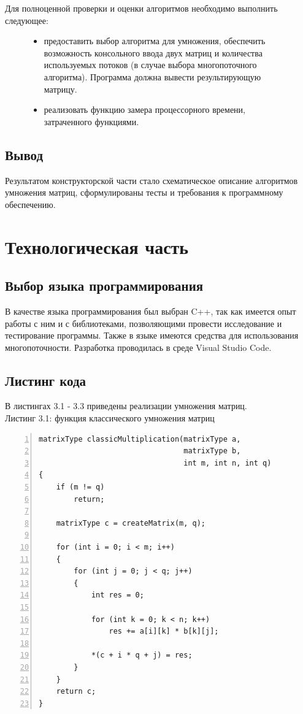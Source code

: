 \documentclass[12pt,a4paper]{report}
\begin{document}
Для полноценной проверки и оценки алгоритмов необходимо выполнить следующее:
\begin{figure}[h!]
    \begin{itemize}
        \item предоставить выбор алгоритма для умножения, обеспечить возможность консольного ввода двух 
        матриц и количества используемых потоков (в случае выбора многопоточного алгоритма). Программа 
        должна вывести результирующую матрицу.
        \item реализовать функцию замера процессорного времени, затраченного функциями.
    \end{itemize}
\end{figure}

\newpage
\section{Вывод}

Результатом конструкторской части стало схематическое описание алгоритмов умножения матриц, 
сформулированы тесты и требования к программному обеспечению.

\newpage
\chapter{Технологическая часть} 

\section{Выбор языка программирования}

В качестве языка программирования был выбран C++, так как имеется опыт работы с ним и с 
библиотеками, позволяющими провести исследование и тестирование программы. 
Также в языке имеются средства для использования многопоточности. 
Разработка проводилась в среде Visual Studio Code.

\section{Листинг кода}

В листингах 3.1 - 3.3 приведены реализации умножения матриц. \\

\textrm{Листинг 3.1: функция классического умножения матриц}
\begin{lstlisting}[frame=single, numbers=left]
matrixType classicMultiplication(matrixType a, 
                                 matrixType b, 
                                 int m, int n, int q)
{
    if (m != q)
        return;

    matrixType c = createMatrix(m, q);
    
    for (int i = 0; i < m; i++)
    {
        for (int j = 0; j < q; j++)
        {
            int res = 0;
    
            for (int k = 0; k < n; k++)
                res += a[i][k] * b[k][j];
    
            *(c + i * q + j) = res;
        }
    }
    return c;
}
\end{lstlisting}
\end{document}
